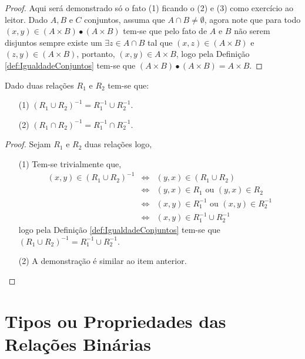 \begin{proof}
	Aqui será demonstrado só o fato (1) ficando o (2) e (3) como exercício ao leitor. Dado $A, B$ e $C$ conjuntos, assuma que $A \cap B \neq \emptyset$, agora note que para todo $(x, y) \in (A \times B) \bullet (A \times B)$ tem-se que pelo fato de $A$ e $B$ não serem disjuntos sempre existe um $\exists z \in A \cap B$ tal que $(x, z) \in (A \times B)$ e $(z, y) \in (A \times B)$, portanto, $(x, y) \in A \times B$, logo pela Definição \ref{def:IgualdadeConjuntos} tem-se que $(A \times B) \bullet (A \times B) = A \times B$.
\end{proof}

\begin{teorema}\label{teo:DistributividadeDaRelacaoInversa}
	Dado duas relações $R_1$ e $R_2$ tem-se que:
	\begin{itemize}
		\item[(1)] $(R_1 \cup R_2)^{-1} = R_1^{-1} \cup R_2^{-1}$.
		\item[(2)] $(R_1 \cap R_2)^{-1} = R_1^{-1} \cap R_2^{-1}$.
	\end{itemize}
\end{teorema}

\begin{proof}
	Sejam $R_1$ e $R_2$ duas relações logo,
	\begin{itemize}
		\item[(1)] Tem-se trivialmente que,  
      \begin{eqnarray*}
        (x, y) \in (R_1 \cup R_2)^{-1} & \Longleftrightarrow &  (y, x) \in (R_1 \cup R_2)\\
        & \Longleftrightarrow & (y, x) \in R_1 \text{ ou } (y, x) \in R_2\\
        & \Longleftrightarrow & (x, y) \in R_1^{-1} \text{ ou } (x, y) \in R_2^{-1}\\
        & \Longleftrightarrow & (x, y) \in R_1^{-1} \cup R_2^{-1}
      \end{eqnarray*}
      logo pela Definição \ref{def:IgualdadeConjuntos} tem-se que $(R_1 \cup R_2)^{-1} = R_1^{-1} \cup R_2^{-1}$.
		\item[(2)] A demonstração é similar ao item anterior.
	\end{itemize}
\end{proof}

\section{Tipos ou Propriedades das Relações Binárias}\label{sec:TipoDasRelacoesBinarias}

